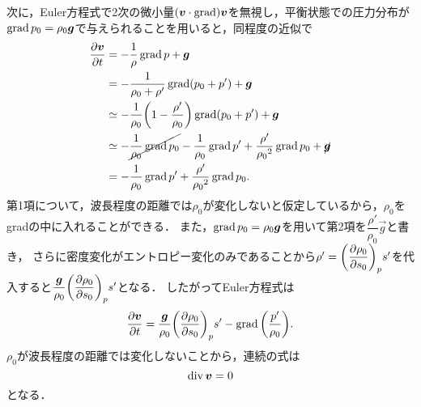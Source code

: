 次に，Euler方程式で2次の微小量$(\vb*{v}\cdot\operatorname{grad})\vb*{v}$を無視し，平衡状態での圧力分布が$\operatorname{grad} p_0 = \rho_0 \vb*{g}$で与えられることを用いると，同程度の近似で
\begin{align*}
    \pdv{\v}{t} &= - \frac{1}{\rho} \Grad p + \vec{g} \\
    &= - \frac{1}{\rho_0+\rho'} \Grad(p_0+p') + \vec{g} \\
    &\simeq - \frac{1}{\rho_0} \pqty{1-\frac{\rho'}{\rho_0}} \Grad(p_0+p') + \vec{g} \\
    &\simeq - \cancel{ \frac{1}{\rho_0}\Grad p_0 } - \frac{1}{\rho_0}\Grad p' + \frac{\rho'}{{\rho_0}^2} \Grad p_0 + \cancel{\vec{g}} \\
    &= - \frac{1}{\rho_0}\Grad p' + \frac{\rho'}{{\rho_0}^2} \Grad p_0 .
\end{align*}
第1項について，波長程度の距離では$\rho_0$が変化しないと仮定しているから，$\rho_0$をgradの中に入れることができる．
また，$\operatorname{grad} p_0 = \rho_0 \vb*{g}$を用いて第2項を$\dfrac{\rho'}{\rho_0} \vec{g}$と書き，
さらに密度変化がエントロピー変化のみであることから$\rho'=\dPDV{\rho_0}{s_0}{p}s'$を代入すると$\dfrac{\vec{g}}{\rho_0} \dPDV{\rho_0}{s_0}{p} s'$となる．
したがってEuler方程式は
\begin{equation}\label{eq13.2:内部波でのEuler方程式}
    \pdv{\v}{t} = \frac{\vec{g}}{\rho_0} \PDV{\rho_0}{s_0}{p} s' - \Grad\pqty{\frac{p'}{\rho_0}} .
\end{equation}
$\rho_0$が波長程度の距離では変化しないことから，連続の式は
\begin{equation}\label{eq13.3:内部波での連続の式}
    \operatorname{div}\vb*{v}=0
\end{equation}
となる．


